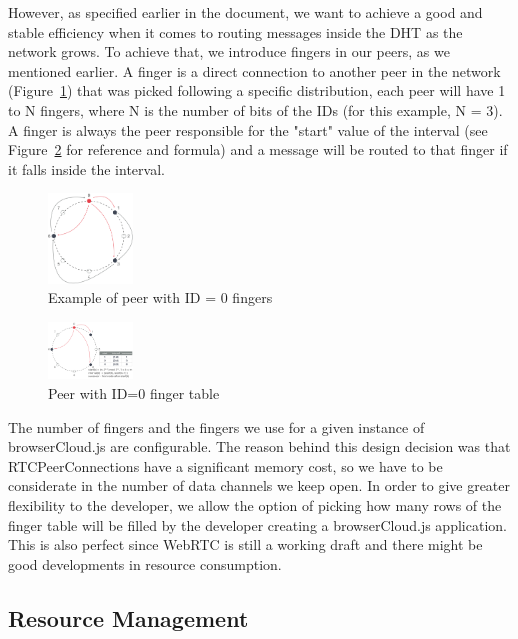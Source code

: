 However, as specified earlier in the document, we want to achieve a good and stable efficiency when it comes to routing messages inside the DHT as the network grows. To achieve that, we introduce fingers in our peers, as we mentioned earlier. A finger is a direct connection to another peer in the network (Figure~\ref{fig:c-5}) that was picked following a specific distribution, each peer will have 1 to N fingers, where N is the number of bits of the IDs (for this example, N = 3). A finger is always the peer responsible for the "start" value of the interval (see Figure~\ref{fig:c-6} for reference and formula) and a message will be routed to that finger if it falls inside the interval.

\begin{figure}[h!]
  \centering
  \includegraphics[width=0.2\textwidth]{figs/chord-5}
  \caption{Example of peer with ID = 0 fingers}
  \label{fig:c-5}
\end{figure}

\begin{figure}[h!]
  \centering
  \includegraphics[width=0.2\textwidth]{figs/chord-6}
  \caption{Peer with ID=0 finger table}
  \label{fig:c-6}
\end{figure}

The number of fingers and the fingers we use for a given instance of browserCloud.js are configurable. The reason behind this design decision was that RTCPeerConnections have a significant memory cost, so we have to be considerate in the number of data channels we keep open. In order to give greater flexibility to the developer, we allow the option of picking how many rows of the finger table will be filled by the developer creating a browserCloud.js application. This is also perfect since WebRTC is still a working draft and there might be good developments in resource consumption.

\subsection{Resource Management}

